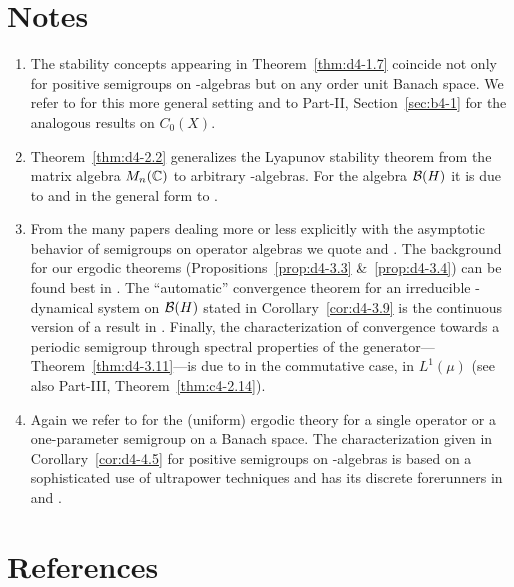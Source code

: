 \section*{Notes}\label{notes:d4-notes}
\begin{enumerate}[label=\emph{Section \arabic*:}, wide, itemsep=1ex]
\item
The stability concepts appearing in Theorem~\ref{thm:d4-1.7} coincide not only for positive semigroups on \CA-algebras but on any order unit Banach space.
We refer to \textcite{battyrobinson:1984} for this more general setting and to Part-II, Section~\ref{sec:b4-1} for the analogous results on $ C_{0}(X) $.


\item
Theorem~\ref{thm:d4-2.2} generalizes the Lyapunov stability theorem from the matrix algebra $ M_{n}(\mathbb{C}) $  to arbitrary \WA-algebras.
For the algebra $ \mathcal{B}(H) $  it is due to \textcite{milstein:1975} and in the general form to \textcite{grohneubrander:1981}.


\item
From the many papers dealing more or less explicitly with the asymptotic behavior of semigroups on operator algebras we quote \textcite{frigerioverri:1982} and \textcite{watanabe:1982}.
The background for our ergodic theorems (Propositions~\ref{prop:d4-3.3} \&~\ref{prop:d4-3.4}) can be found best in \textcite{krengel:1985}.
The \enquote{automatic} convergence theorem for an irreducible \WA-dynamical system on $ \mathcal{B}(H) $  stated in Corollary~\ref{cor:d4-3.9} is the continuous version of a result in \textcite{groh:1984c}.
Finally, the characterization of convergence towards a periodic semigroup through spectral properties of the generator---Theorem~\ref{thm:d4-3.11}---is due to \textcite{nagel:1984} in the commutative case, \ie in $ L^{1}(\mu) $ (see also Part-III, Theorem~\ref{thm:c4-2.14}).

\item
Again we refer to \textcite{krengel:1985} for the (uniform) ergodic theory for a single operator or a one-parameter semigroup on a Banach space.
The characterization given in Corollary~\ref{cor:d4-4.5} for positive semigroups on \WA-algebras is based on a sophisticated use of ultrapower techniques and has its discrete forerunners in \textcite{lotz:1981} and 
\textcite{groh:1984b}.
\end{enumerate}
\section*{References}
{\RaggedRight
  \printbibliography[heading=none]
 }

